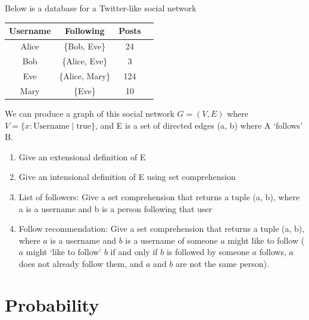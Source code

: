 \documentclass[twocolumn]{article}
\newcommand\mrk[1]{}
\begin{document}
\subsection{}

    Below is a database for a Twitter-like social network

    \begin{table}[h!]
        \centering
        \begin{tabular}{c | c | c | c }
            \toprule
            Username & Following & Posts \\
            \midrule
            Alice & \{Bob, Eve\} & 24 \\
            Bob & \{Alice, Eve\} & 3  \\
            Eve & \{Alice, Mary\} & 124 \\
            Mary & \{Eve\} & 10 \\
            \bottomrule
        \end{tabular}
    \end{table}

    We can produce a graph of this social network $ G = ( V, E)$ where $ V = \{ x : \text{Username} \mid \text{true} \}$, and E is a set of directed edges (a, b) where A `follows' B.

    \begin{enumerate}
        \item Give an extensional definition of E \mrk{1}
        \item Give an intensional definition of E using set comprehension \mrk{2}
        \item List of followers: Give a set comprehension that returns a tuple (a, b), where a is a username and b is a person following that user \mrk{2}
        \item Follow recommendation: Give a set comprehension that returns a tuple (a, b), where $a$ is a username and $b$ is a username of someone $a$ might like to follow ($a$ might `like to follow' $b$ if and only if $b$ is followed by someone $a$ follows, $a$ does not already follow them, and $a$ and $b$ are not the same person). \mrk{2}
    \end{enumerate}


\clearpage
\section{Probability}

\subsection{}
\end{document}
